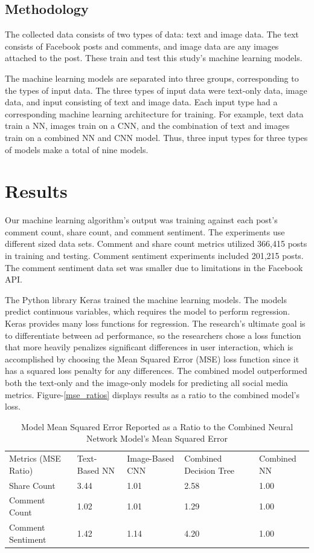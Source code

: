 \documentclass{article}
\begin{document}
\subsection{Methodology}
The collected data consists of two types of data: text and image data. The text consists of Facebook posts and comments, and image data are any images attached to the post. These train and test this study's machine learning models. 

The machine learning models are separated into three groups, corresponding to the types of input data. The three types of input data were text-only data, image data, and input consisting of text and image data. Each input type had a corresponding machine learning architecture for training. For example, text data train a NN, images train on a CNN, and the combination of text and images train on a combined NN and CNN model. Thus, three input types for three types of models make a total of nine models.

\section{Results}
Our machine learning algorithm's output was training against each post's comment count, share count, and comment sentiment. The experiments use different sized data sets.  Comment and share count metrics utilized 366,415 posts in training and testing. Comment sentiment experiments included 201,215 posts. The comment sentiment data set was smaller due to limitations in the Facebook API.

The Python library Keras trained the machine learning models. The models predict continuous variables, which requires the model to perform regression. Keras provides many loss functions for regression.  The research's ultimate goal is to differentiate between ad performance, so the researchers chose a loss function that more heavily penalizes significant differences in user interaction, which is accomplished by choosing the Mean Squared Error (MSE) loss function since it has a squared loss penalty for any differences.  The combined model outperformed both the text-only and the image-only models for predicting all social media metrics.  Figure-\ref{mse_ratios} displays results as a ratio to the combined model's loss. 

\begin{table}[]
\centering
\begin{tabular}{lllll}
Metrics (MSE Ratio) & Text-Based NN & Image-Based CNN & Combined Decision Tree & Combined NN \\
Share Count       & 3.44 & 1.01 & 2.58 & 1.00 \\
Comment Count     & 1.02 & 1.01 & 1.29 & 1.00 \\
Comment Sentiment & 1.42 & 1.14 & 4.20 & 1.00
\end{tabular}
\caption{\label{tab:widgets}Model Mean Squared Error Reported as a Ratio to the Combined Neural Network Model's Mean Squared Error}
\end{table}
\end{document}
